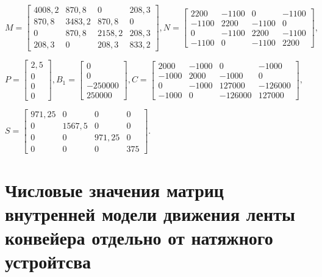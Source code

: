 $
M = 
\begin{bmatrix}
	4008,2 & 870,8  & 0      & 208,3 \\
	870,8  & 3483,2 & 870,8  & 0     \\
	0      & 870,8  & 2158,2 & 208,3 \\
	208,3  & 0      & 208,3  & 833,2 
\end{bmatrix}, N = 
\begin{bmatrix}
	2200  & -1100 & 0     & -1100    \\
	-1100 & 2200  & -1100 & 0        \\
	0     & -1100 & 2200  & -1100    \\
	-1100 & 0     & -1100 & 2200                                   
\end{bmatrix},
$
\bigskip

$
P = 
\begin{bmatrix}
	2,5                               \\
	0                                 \\
	0                                 \\
	0                      
\end{bmatrix}, B_1 = 
\begin{bmatrix}
	0                                 \\
	0                                 \\
	-250000                           \\
	250000
\end{bmatrix}, C = 
\begin{bmatrix}
	2000  & -1000 & 0       & -1000   \\
	-1000 & 2000  & -1000   & 0       \\
	0     & -1000 & 127000  & -126000 \\
	-1000 & 0     & -126000 & 127000   
\end{bmatrix},
$
\bigskip

$
S = 
\begin{bmatrix}
	971,25 & 0      & 0      & 0     \\
	0      & 1567,5 & 0      & 0     \\
	0      & 0      & 971,25 & 0     \\
	0      & 0      & 0      & 375  
\end{bmatrix}.
$

\section{Числовые значения матриц внутренней модели движения ленты конвейера отдельно от натяжного устройтсва}\label{Appendix14}

